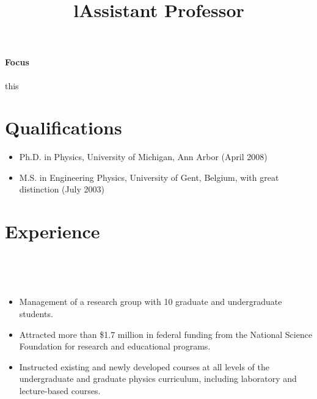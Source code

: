 \documentclass[overlapped,line,final,11pt,letterpaper]{res}
\begin{document}
\address{P.O. Box 8795, Williamsburg, VA 23187 $\bullet$ (757) 221-3539 $\bullet$ \href{mailto:Wouter Deconinck <wdeconinck@wm.edu>}{\texttt{wdeconinck@wm.edu}}}

\begin{resume}
\vspace{-\baselineskip}
\paragraph{Focus} this \\



\section{\bf Qualifications}
\begin{itemize}
\item Ph.D. in Physics, University of Michigan, Ann Arbor (April 2008)
\item M.S. in Engineering Physics, University of Gent, Belgium, with great distinction (July 2003)
\end{itemize}


\section{\bf Experience}

\begin{format}
\\
\title{l}\\
\body
\end{format}

\title{Assistant Professor}
\begin{position}
\vspace{-0.8\baselineskip}
\begin{itemize}
\item Management of a research group with 10 graduate and undergraduate students.
\item Attracted more than \$1.7 million in federal funding from the National Science Foundation for research and educational programs.
\item Instructed existing and newly developed courses at all levels of the undergraduate and graduate physics curriculum, including laboratory and lecture-based courses.
\end{itemize}
\end{position}


\end{resume}
\end{document}
